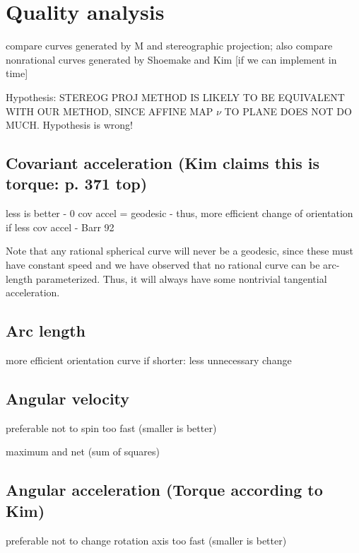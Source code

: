 
\section{Quality analysis}

compare curves generated by M and stereographic projection;
also compare nonrational curves generated by Shoemake and Kim [if we can implement in time]

Hypothesis: STEREOG PROJ METHOD IS LIKELY TO BE EQUIVALENT WITH OUR METHOD, 
SINCE AFFINE MAP $\nu$ TO PLANE DOES NOT DO MUCH.
Hypothesis is wrong!

\subsection{Covariant acceleration (Kim claims this is torque: p. 371 top)}

less is better 
	- 0 cov accel = geodesic
		- thus, more efficient change of orientation if less cov accel
	- Barr 92

Note that any rational spherical curve will never be a geodesic, since these must have
constant speed and we have observed that no rational curve can be arc-length parameterized.
Thus, it will always have some nontrivial tangential acceleration.

\subsection{Arc length}

more efficient orientation curve if shorter: less unnecessary change

\subsection{Angular velocity}

\cite[p. 659]{beer77}

preferable not to spin too fast (smaller is better)

maximum and net (sum of squares)

\subsection{Angular acceleration (Torque according to Kim)}

preferable not to change rotation axis too fast (smaller is better)


